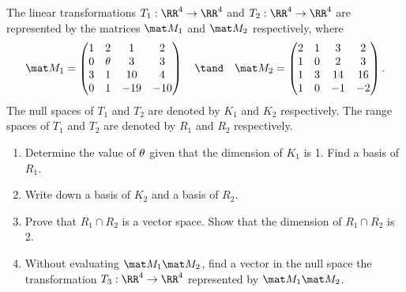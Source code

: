 \begin{problem}
    The linear transformations $T_1 : \RR^4 \to \RR^4$ and $T_2 : \RR^4 \to \RR^4$ are represented by the matrices $\mat M_1$ and $\mat M_2$ respectively, where \[\mat M_1 = \begin{pmatrix}1 & 2 & 1 & 2 \\ 0 & \t & 3 & 3 \\ 3 & 1 & 10 & 4 \\ 0 & 1 & -19 & -10 \end{pmatrix} \quad \tand \quad \mat M_2 = \begin{pmatrix}2 & 1 & 3 & 2 \\ 1 & 0 & 2 & 3 \\ 1 & 3 & 14 & 16 \\ 1 & 0 & -1 & -2\end{pmatrix}.\] The null spaces of $T_1$ and $T_2$ are denoted by $K_1$ and $K_2$ respectively. The range spaces of $T_1$ and $T_2$ are denoted by $R_1$ and $R_2$ respectively.

    \begin{enumerate}
        \item Determine the value of $\theta$ given that the dimension of $K_1$ is 1. Find a basis of $R_1$.
        \item Write down a basis of $K_2$ and a basis of $R_2$.
        \item Prove that $R_1 \cap R_2$ is a vector space. Show that the dimension of $R_1 \cap R_2$ is 2.
        \item Without evaluating $\mat M_1 \mat M_2$, find a vector in the null space the transformation $T_3 : \RR^4 \to \RR^4$ represented by $\mat M_1 \mat M_2$.
    \end{enumerate}
\end{problem}
